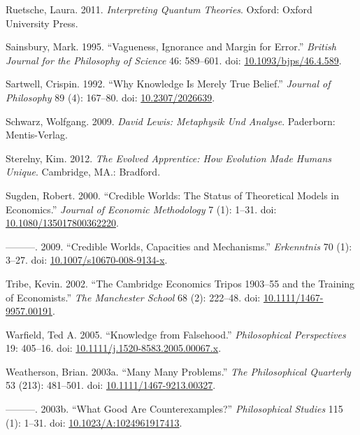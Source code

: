 \documentclass[
  10pt,
  letterpaper,
  DIV=11,
  numbers=noendperiod,
  twoside]{scrartcl}
\newlength{\cslhangindent}
\newenvironment{CSLReferences}[2] %
 {\begin{list}{}{%
  \setlength{\itemindent}{0pt}
  \setlength{\leftmargin}{0pt}
  \setlength{\parsep}{0pt}
  \ifodd #1
   \setlength{\leftmargin}{\cslhangindent}
   \setlength{\itemindent}{-1\cslhangindent}
  \fi
  \setlength{\itemsep}{#2\baselineskip}}}
 {\end{list}}
\begin{document}
\begin{CSLReferences}{1}{0}
Ruetsche, Laura. 2011. \emph{Interpreting Quantum Theories}. Oxford:
Oxford University Press.

Sainsbury, Mark. 1995. {``Vagueness, Ignorance and Margin for Error.''}
\emph{British Journal for the Philosophy of Science} 46: 589--601. doi:
\href{https://doi.org/10.1093/bjps/46.4.589}{10.1093/bjps/46.4.589}.

Sartwell, Crispin. 1992. {``Why Knowledge Is Merely True Belief.''}
\emph{Journal of Philosophy} 89 (4): 167--80. doi:
\href{https://doi.org/10.2307/2026639}{10.2307/2026639}.

Schwarz, Wolfgang. 2009. \emph{David Lewis: Metaphysik Und Analyse}.
Paderborn: Mentis-Verlag.

Sterelny, Kim. 2012. \emph{The Evolved Apprentice: How Evolution Made
Humans Unique}. Cambridge, MA.: Bradford.

Sugden, Robert. 2000. {``Credible Worlds: The Status of Theoretical
Models in Economics.''} \emph{Journal of Economic Methodology} 7 (1):
1--31. doi:
\href{https://doi.org/10.1080/135017800362220}{10.1080/135017800362220}.

---------. 2009. {``Credible Worlds, Capacities and Mechanisms.''}
\emph{Erkenntnis} 70 (1): 3--27. doi:
\href{https://doi.org/10.1007/s10670-008-9134-x}{10.1007/s10670-008-9134-x}.

Tribe, Kevin. 2002. {``The Cambridge Economics Tripos 1903--55 and the
Training of Economists.''} \emph{The Manchester School} 68 (2): 222--48.
doi:
\href{https://doi.org/10.1111/1467-9957.00191}{10.1111/1467-9957.00191}.

Warfield, Ted A. 2005. {``Knowledge from Falsehood.''}
\emph{Philosophical Perspectives} 19: 405--16. doi:
\href{https://doi.org/10.1111/j.1520-8583.2005.00067.x}{10.1111/j.1520-8583.2005.00067.x}.

Weatherson, Brian. 2003a. {``{Many Many Problems}.''} \emph{The
Philosophical Quarterly} 53 (213): 481--501. doi:
\href{https://doi.org/10.1111/1467-9213.00327}{10.1111/1467-9213.00327}.

---------. 2003b. {``{What Good Are Counterexamples?}''}
\emph{Philosophical Studies} 115 (1): 1--31. doi:
\href{https://doi.org/10.1023/A:1024961917413}{10.1023/A:1024961917413}.


\end{CSLReferences}
\end{document}
